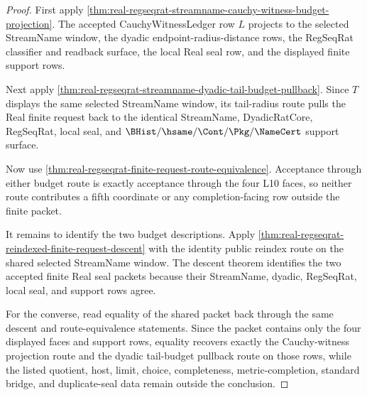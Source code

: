 \begin{proof}
First apply \autoref{thm:real-regseqrat-streamname-cauchy-witness-budget-projection}. The accepted CauchyWitnessLedger row $L$ projects to the selected StreamName window, the dyadic endpoint-radius-distance rows, the RegSeqRat classifier and readback surface, the local Real seal row, and the displayed finite support rows.

Next apply \autoref{thm:real-regseqrat-streamname-dyadic-tail-budget-pullback}. Since $T$ displays the same selected StreamName window, its tail-radius route pulls the Real finite request back to the identical StreamName, DyadicRatCore, RegSeqRat, local seal, and $\BHist/\hsame/\Cont/\Pkg/\NameCert$ support surface.

Now use \autoref{thm:real-regseqrat-finite-request-route-equivalence}. Acceptance through either budget route is exactly acceptance through the four L10 faces, so neither route contributes a fifth coordinate or any completion-facing row outside the finite packet.

It remains to identify the two budget descriptions. Apply \autoref{thm:real-regseqrat-reindexed-finite-request-descent} with the identity public reindex route on the shared selected StreamName window. The descent theorem identifies the two accepted finite Real seal packets because their StreamName, dyadic, RegSeqRat, local seal, and support rows agree.

For the converse, read equality of the shared packet back through the same descent and route-equivalence statements. Since the packet contains only the four displayed faces and support rows, equality recovers exactly the Cauchy-witness projection route and the dyadic tail-budget pullback route on those rows, while the listed quotient, host, limit, choice, completeness, metric-completion, standard bridge, and duplicate-seal data remain outside the conclusion.
\end{proof}

